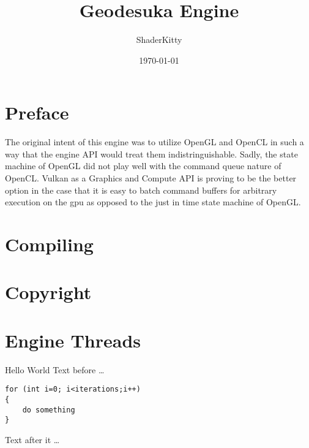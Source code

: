 \documentclass{book}
\title{Geodesuka Engine}
\author{ShaderKitty}
\date{\today}
\begin{document}
\maketitle

\tableofcontents

\frontmatter
\chapter{Preface}
The original intent of this engine was to utilize OpenGL and OpenCL in such a way that the engine API would treat them indistringuishable. Sadly, the state machine of OpenGL did not play well with the command queue nature of OpenCL. Vulkan as a Graphics and Compute API is proving to be the better option in the case that it is easy to batch command buffers for arbitrary execution on the gpu as opposed to the just in time state machine of OpenGL.
\mainmatter
\chapter{Compiling}

\chapter{Copyright}

\chapter{Engine Threads}

Hello World
Text before \dots
\begin{lstlisting}
for (int i=0; i<iterations;i++)
{
	do something
}
\end{lstlisting}
Text after it \dots
\end{document}

